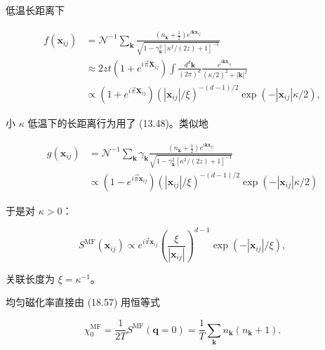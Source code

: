 低温长距离下

\begin{align*}
f ( \mathbf {x} _ {ij} ) & = \mathcal {N} ^ {- 1} \sum_ {\mathbf {k}} \frac {\left( n _ {\mathbf {k}} + \frac {1}{2} \right) e ^ {i \mathbf {k} \mathbf {x} _ {ij}}}{\sqrt {1 - \gamma_{\mathbf {k}} ^ {2} \left[ \kappa^ {2} / (2z) + 1 \right] ^ {- 1}}}\\
& \approx 2 z t \left( 1 + e ^ {i \vec {\pi} \mathbf {X} _ {ij}} \right) \int \frac {d ^ {d} \mathbf {k}}{( 2 \pi ) ^ {d}} \frac {e ^ {i \mathbf {k} \mathbf {x} _ {ij}}}{( \kappa / 2 ) ^ {2} + | \mathbf {k} | ^ {2}}\\
& \propto \left( 1 + e ^ {i \vec {\pi} \mathbf {X} _ {ij}} \right) \left( | \mathbf {x} _ {ij} | / \xi \right) ^ {- ( d - 1 )/2} \exp \left( - | \mathbf {x} _ {ij} | \kappa / 2 \right) ,
\tag{18.60}
\end{align*}

小 $\kappa$ 低温下的长距离行为用了 (13.48)。类似地

\begin{align*}
g ( \mathbf {x} _ {ij} ) & = \mathcal {N} ^ {- 1} \sum_ {\mathbf {k}} \gamma_ {\mathbf {k}} \frac {\left( n _ {\mathbf {k}} + \frac {1}{2} \right) e ^ {i \mathbf {k} \mathbf {x} _ {ij}}}{\sqrt {1 - \gamma_{\mathbf {k}} ^ {2} \left[ \kappa^ {2} / (2z) + 1 \right] ^ {- 1}}}\\
& \propto \left( 1 - e ^ {i \vec {\pi} \mathbf {x} _ {ij}} \right) \left( | \mathbf {x} _ {ij} | / \xi \right) ^ {- ( d - 1 )/2} \exp \left( - | \mathbf {x} _ {ij} | \kappa / 2 \right)
\tag{18.61}
\end{align*}

于是对 $\kappa > 0$：

\begin{equation*}
S ^ {\mathrm{MF}} ( \mathbf {x} _ {ij} ) \propto e ^ {i \vec {\pi} \mathbf {x} _ {ij}} \left( \frac {\xi}{| \mathbf {x} _ {ij} |} \right) ^ {d - 1} \exp \left( - | \mathbf {x} _ {ij} | / \xi \right) ,
\tag{18.62}
\end{equation*}

关联长度为 $\xi = \kappa^{-1}$。

均匀磁化率直接由 (18.57) 用恒等式

\begin{equation*}
\chi_ {0} ^ {\mathrm{MF}} = \frac {1}{2 T} S ^ {\mathrm{MF}} ( \mathbf {q} = 0 ) = \frac {1}{T} \sum_ {\mathbf {k}} n _ {\mathbf {k}} \left( n _ {\mathbf {k}} + 1 \right).
\tag{18.63}
\end{equation*}

